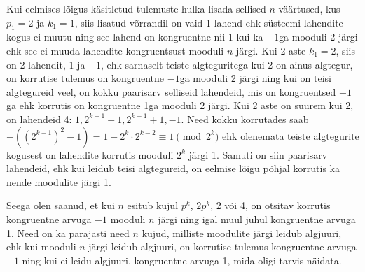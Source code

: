 \documentclass[a4paper, 10pt]{article}
\begin{document}
Kui eelmises lõigus käsitletud tulemuste hulka lisada sellised $n$ väärtused, kus $p_1=2$ ja $k_1=1$, siis lisatud võrrandil on vaid 1 lahend ehk süsteemi lahendite kogus ei muutu ning see lahend on kongruentne nii 1 kui ka $-1$ga mooduli 2 järgi ehk see ei muuda lahendite kongruentsust mooduli $n$ järgi. Kui 2 aste $k_1=2$, siis on 2 lahendit, 1 ja $-1$, ehk sarnaselt teiste algteguritega kui 2 on ainus algtegur, on korrutise tulemus on kongruentne $-1$ga mooduli 2 järgi ning kui on teisi algtegureid veel, on kokku paarisarv selliseid lahendeid, mis on kongruentsed $-1$ga ehk korrutis on kongruentne 1ga mooduli 2 järgi. Kui 2 aste on suurem kui 2, on lahendeid 4: $1, 2^{k-1}-1, 2^{k-1}+1,-1$. Need kokku korrutades saab $-((2^{k-1})^2-1)=1-2^k\cdot2^{k-2}\equiv1\pmod{2^k}$ ehk olenemata teiste algtegurite kogusest on lahendite korrutis mooduli $2^k$ järgi 1. Samuti on siin paarisarv lahendeid, ehk kui leidub teisi algtegureid, on eelmise lõigu põhjal korrutis ka nende moodulite järgi 1.

Seega olen saanud, et kui $n$ esitub kujul $p^k$, $2p^k$, 2 või 4, on otsitav korrutis kongruentne arvuga $-1$ mooduli $n$ järgi ning igal muul juhul kongruentne arvuga 1. Need on ka parajasti need $n$ kujud, milliste moodulite järgi leidub algjuuri, ehk kui mooduli $n$ järgi leidub algjuuri, on korrutise tulemus kongruentne arvuga $-1$ ning kui ei leidu algjuuri, kongruentne arvuga 1, mida oligi tarvis näidata.
\end{document}
